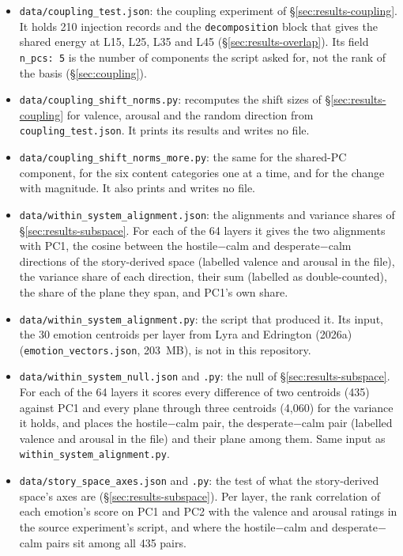 \documentclass[11pt,a4paper]{article}
\begin{document}
\begin{itemize}
  \item \texttt{data/\allowbreak coupling\_test.json}: the coupling experiment of \S\ref{sec:results-coupling}. It holds 210 injection records and the \texttt{decomposition} block that gives the shared energy at L15, L25, L35 and L45 (\S\ref{sec:results-overlap}). Its field \texttt{n\_pcs: 5} is the number of components the script asked for, not the rank of the basis (\S\ref{sec:coupling}).
  \item \texttt{data/\allowbreak coupling\_shift\_norms.py}: recomputes the shift sizes of \S\ref{sec:results-coupling} for valence, arousal and the random direction from \texttt{coupling\_test.json}. It prints its results and writes no file.
  \item \texttt{data/\allowbreak coupling\_shift\_norms\_more.py}: the same for the shared-PC component, for the six content categories one at a time, and for the change with magnitude. It also prints and writes no file.
  \item \texttt{data/\allowbreak within\_system\_alignment.json}: the alignments and variance shares of \S\ref{sec:results-subspace}. For each of the 64 layers it gives the two alignments with PC1, the cosine between the hostile$-$calm and desperate$-$calm directions of the story-derived space (labelled valence and arousal in the file), the variance share of each direction, their sum (labelled as double-counted), the share of the plane they span, and PC1's own share.
  \item \texttt{data/\allowbreak within\_system\_alignment.py}: the script that produced it. Its input, the 30 emotion centroids per layer from Lyra and Edrington (2026a) (\texttt{emotion\_vectors.json}, 203~MB), is not in this repository.
  \item \texttt{data/\allowbreak within\_system\_null.json} and \texttt{.py}: the null of \S\ref{sec:results-subspace}. For each of the 64 layers it scores every difference of two centroids (435) against PC1 and every plane through three centroids (4,060) for the variance it holds, and places the hostile$-$calm pair, the desperate$-$calm pair (labelled valence and arousal in the file) and their plane among them. Same input as \texttt{within\_system\_alignment.py}.
  \item \texttt{data/\allowbreak story\_space\_axes.json} and \texttt{.py}: the test of what the story-derived space's axes are (\S\ref{sec:results-subspace}). Per layer, the rank correlation of each emotion's score on PC1 and PC2 with the valence and arousal ratings in the source experiment's script, and where the hostile$-$calm and desperate$-$calm pairs sit among all 435 pairs.

\end{itemize}
\end{document}
